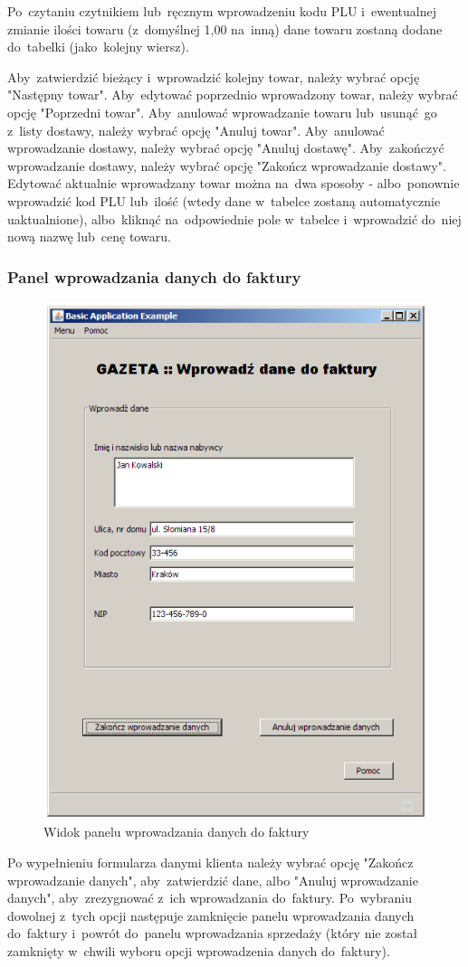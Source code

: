 Po~czytaniu czytnikiem lub~ręcznym wprowadzeniu kodu PLU i~ewentualnej zmianie ilości towaru (z~domyślnej 1,00 na~inną) dane towaru zostaną dodane do~tabelki (jako~kolejny wiersz).

Aby~zatwierdzić bieżący i~wprowadzić kolejny towar, należy wybrać opcję "Następny towar". Aby~edytować poprzednio wprowadzony towar, należy wybrać opcję "Poprzedni towar". Aby~anulować wprowadzanie towaru lub~usunąć~go z~listy dostawy, należy wybrać opcję "Anuluj towar". Aby~anulować wprowadzanie dostawy, należy wybrać opcję "Anuluj dostawę". Aby~zakończyć wprowadzanie dostawy, należy wybrać opcję "Zakończ wprowadzanie dostawy".
Edytować aktualnie wprowadzany towar można na~dwa sposoby - albo~ponownie wprowadzić kod PLU lub~ilość (wtedy dane w~tabelce zostaną automatycznie uaktualnione), albo~kliknąć na~odpowiednie pole w~tabelce i~wprowadzić do~niej nową nazwę lub~cenę towaru.
\subsubsection{Panel wprowadzania danych do faktury}
\begin{figure}
\includegraphics[width=1\textwidth]{gfx/dane_faktury.png}
\caption{Widok panelu wprowadzania danych do faktury}
\end{figure}
Po wypełnieniu formularza danymi klienta należy wybrać opcję "Zakończ wprowadzanie danych", aby~zatwierdzić dane, albo "Anuluj wprowadzanie danych", aby~zrezygnować z~ich wprowadzania do~faktury. Po~wybraniu dowolnej z~tych opcji następuje zamknięcie panelu wprowadzania danych do~faktury i~powrót do~panelu wprowadzania sprzedaży (który nie został zamknięty w~chwili wyboru opcji wprowadzenia danych do~faktury).
